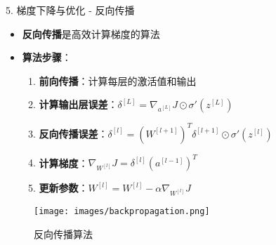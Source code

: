\documentclass[
  ignorenonframetext,
  aspectratio=169,
  chinese-hans,
]{beamer}
\providecommand{\tightlist}{%
  \setlength{\itemsep}{0pt}\setlength{\parskip}{0pt}}\usepackage{longtable,booktabs,array}
\begin{document}
\begin{frame}{5. 梯度下降与优化 - 反向传播}
\label{ux68afux5ea6ux4e0bux964dux4e0eux4f18ux5316---ux53cdux5411ux4f20ux64ad}
\begin{itemize}
\item
  \textbf{反向传播}是高效计算梯度的算法
\item
  \textbf{算法步骤}：

  \begin{enumerate}
  \tightlist
  \item
    \textbf{前向传播}：计算每层的激活值和输出
  \item
    \textbf{计算输出层误差}：\(\delta^{[L]} = \nabla_{a^{[L]}}J \odot \sigma'(z^{[L]})\)
  \item
    \textbf{反向传播误差}：\(\delta^{[l]} = (W^{[l+1]})^T\delta^{[l+1]} \odot \sigma'(z^{[l]})\)
  \item
    \textbf{计算梯度}：\(\nabla_{W^{[l]}}J = \delta^{[l]}(a^{[l-1]})^T\)
  \item
    \textbf{更新参数}：\(W^{[l]} = W^{[l]} - \alpha \nabla_{W^{[l]}}J\)
  \end{enumerate}
\end{itemize}

\begin{figure}[H]

{\centering \texttt{[image: images/backpropagation.png]}

}

\caption{反向传播算法}

\end{figure}%
\end{frame}
\end{document}
